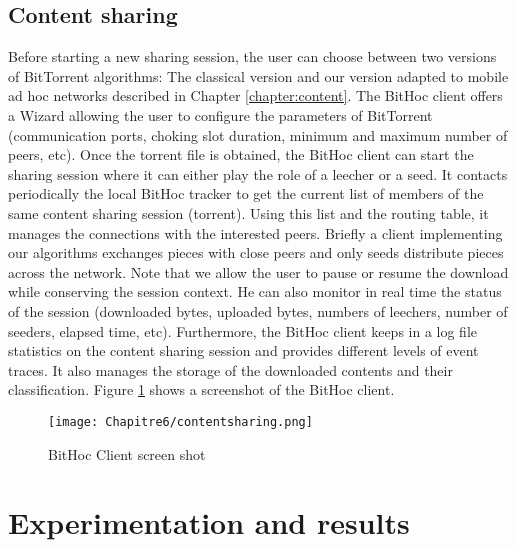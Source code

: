 \subsection{Content sharing}
Before starting a new sharing session, the user can choose between two versions of BitTorrent algorithms: The classical version \cite{BitTorrentW} and our version adapted to mobile ad hoc networks described in Chapter \ref{chapter:content}. The BitHoc client offers a Wizard allowing the user to configure the parameters of BitTorrent (communication ports, choking slot duration, minimum and maximum number of peers, etc). Once the torrent file is obtained, the BitHoc client can start the sharing session where it can either play the role of a leecher or a seed. It contacts periodically the local BitHoc tracker to get the current list of members of the same content sharing session (torrent). Using this list and the routing table, it manages the connections with the interested peers. Briefly a client implementing our algorithms exchanges pieces with close peers and only seeds distribute pieces across the network. Note that we allow the user to pause or resume the download while conserving the session context. He can also monitor in real time the status of the session (downloaded bytes, uploaded bytes, numbers of leechers, number of seeders, elapsed time, etc). Furthermore, the BitHoc client keeps in a log file statistics on the content sharing session and provides different levels of event traces. It also manages the storage of the downloaded contents and their classification. Figure \ref{Figclient} shows a screenshot of the BitHoc client.

\begin{figure}[!htbp]
  \begin{center}
    \texttt{[image: Chapitre6/contentsharing.png]}
  \end{center}
  \caption{BitHoc Client screen shot}
  \label{Figclient}
\end{figure}


\section{Experimentation and results}
\label{sectest}
